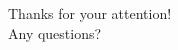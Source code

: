 \begin{frame}[noframenumbering]{}
    \vspace*{6mm}
\begin{center}
    \huge Thanks for your attention!\\ Any questions?
\end{center}
\end{frame}
